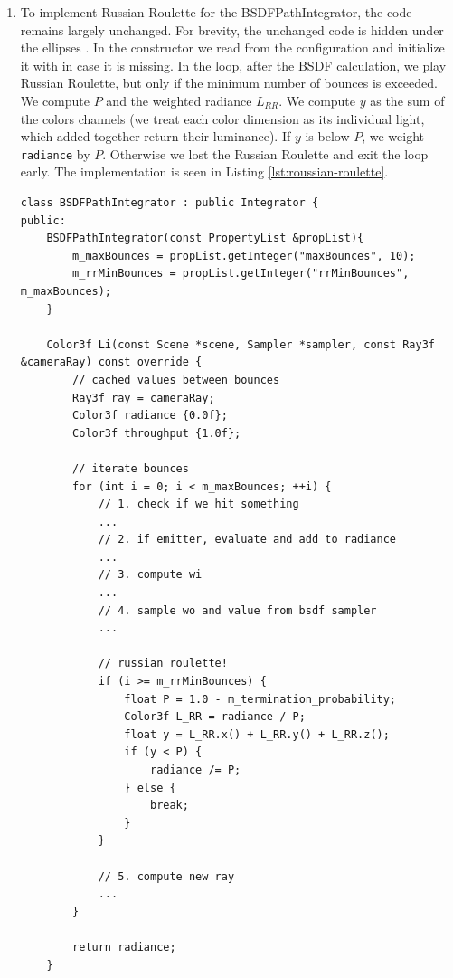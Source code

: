 \begin{enumerate}
\item To implement Russian Roulette for the BSDFPathIntegrator, the code remains largely unchanged. For brevity, the unchanged code is hidden under the ellipses \code{\ldots}. In the constructor we read  from the configuration and initialize it with  in case it is missing. In the loop, after the BSDF calculation, we play Russian Roulette, but only if the minimum number of bounces is exceeded. We compute $P$ and the weighted radiance $L_{RR}$. We compute $y$ as the sum of the colors channels (we treat each color dimension as its individual light, which added together return their luminance). If $y$ is below $P$, we weight \texttt{radiance} by $P$. Otherwise we lost the Russian Roulette and exit the loop early. The implementation is seen in Listing \ref{lst:roussian-roulette}.

\begin{lstlisting}[caption={\code{BSDFPathIntegrator} with Russian Roulette},label={lst:roussian-roulette}]
class BSDFPathIntegrator : public Integrator {
public:
    BSDFPathIntegrator(const PropertyList &propList){
        m_maxBounces = propList.getInteger("maxBounces", 10);
        m_rrMinBounces = propList.getInteger("rrMinBounces", m_maxBounces);
    }

    Color3f Li(const Scene *scene, Sampler *sampler, const Ray3f &cameraRay) const override {
        // cached values between bounces
        Ray3f ray = cameraRay;
        Color3f radiance {0.0f};
        Color3f throughput {1.0f};

        // iterate bounces
        for (int i = 0; i < m_maxBounces; ++i) {
            // 1. check if we hit something
            ...
            // 2. if emitter, evaluate and add to radiance
            ...
            // 3. compute wi
            ...
            // 4. sample wo and value from bsdf sampler
            ...

            // russian roulette!
            if (i >= m_rrMinBounces) {
                float P = 1.0 - m_termination_probability;
                Color3f L_RR = radiance / P;
                float y = L_RR.x() + L_RR.y() + L_RR.z();
                if (y < P) {
                    radiance /= P;
                } else {
                    break;
                }
            }

            // 5. compute new ray
            ...
        }

        return radiance;
    }


\end{lstlisting}
\end{enumerate}
